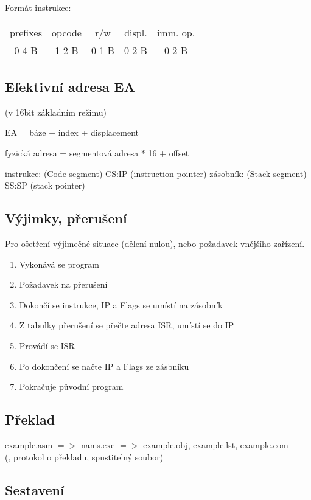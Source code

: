 \documentclass[a4paper, 11pt]{report}
\begin{document}
Formát instrukce:

\begin{tabular}{ *{5}{ | c} |}
	\hline
	prefixes 	& opcode	& r/w	& displ. & imm. op. \\
	0-4 B		& 1-2 B	& 0-1 B & 0-2 B & 0-2 B \\
	\hline
\end{tabular}

\subsection{Efektivní adresa EA}

(v 16bit základním režimu)

EA = báze + index + displacement

fyzická adresa = segmentová adresa * 16 + offset

instrukce: (Code segment) CS:IP (instruction pointer)
zásobník: (Stack segment) SS:SP (stack pointer)

\subsection{Výjimky, přerušení}

Pro ošetření výjimečné situace (dělení nulou), nebo požadavek vnějšího zařízení.

\begin{enumerate}
	\item Vykonává se program
	\item Požadavek na přerušení
	\item Dokončí se instrukce, IP a Flags se umístí na zásobník
	\item Z tabulky přerušení se přečte adresa ISR, umístí se do IP
	\item Provádí se ISR
	\item Po dokončení se načte IP a Flags ze zásbníku
	\item Pokračuje původní program
\end{enumerate}

\subsection{Překlad}

example.asm $=>$ nams.exe $=>$ example.obj, example.lst, example.com\\
 (, protokol o překladu, spustitelný soubor)

\subsection{Sestavení}
\end{document}
